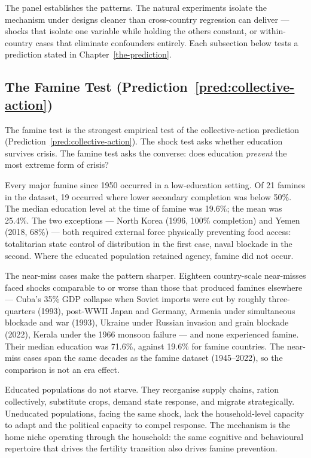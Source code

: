 \documentclass[12pt,letterpaper]{article}
\begin{document}
The panel establishes the patterns. The natural experiments isolate
the mechanism under designs cleaner than cross-country regression can
deliver --- shocks that isolate one variable while holding the others
constant, or within-country cases that eliminate confounders
entirely. Each subsection below tests a prediction stated in
Chapter~\ref{the-prediction}.

\subsection{The Famine Test (Prediction~\ref{pred:collective-action})}\label{the-famine-test}

The famine test is the strongest empirical test of the collective-action prediction (Prediction~\ref{pred:collective-action}). The shock test asks whether education survives crisis. The famine test asks the converse: does education \emph{prevent} the most extreme form of crisis?

Every major famine since 1950 occurred in a low-education setting. Of 21 famines in the dataset, 19 occurred where lower secondary completion was below 50\%. The median education level at the time of famine was 19.6\%; the mean was 25.4\%. The two exceptions --- North Korea (1996, 100\% completion) and Yemen (2018, 68\%) --- both required external force physically preventing food access: totalitarian state control of distribution in the first case, naval blockade in the second. Where the educated population retained agency, famine did not occur.

The near-miss cases make the pattern sharper. Eighteen country-scale near-misses faced shocks comparable to or worse than those that produced famines elsewhere --- Cuba's 35\% GDP collapse when Soviet imports were cut by roughly three-quarters (1993), post-WWII Japan and Germany, Armenia under simultaneous blockade and war (1993), Ukraine under Russian invasion and grain blockade (2022), Kerala under the 1966 monsoon failure --- and none experienced famine. Their median education was 71.6\%, against 19.6\% for famine countries. The near-miss cases span the same decades as the famine dataset (1945--2022), so the comparison is not an era effect.

Educated populations do not starve. They reorganise supply chains, ration collectively, substitute crops, demand state response, and migrate strategically. Uneducated populations, facing the same shock, lack the household-level capacity to adapt and the political capacity to compel response. The mechanism is the home niche operating through the household: the same cognitive and behavioural repertoire that drives the fertility transition also drives famine prevention.
\end{document}
